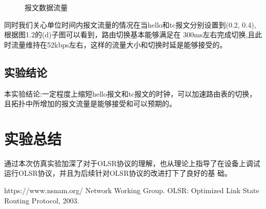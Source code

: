 \documentclass[a4paper,12pt]{report}
\begin{document}
\begin{spacing}{1.5}
\begin{figure}[hbtp]
\caption{报文数据流量}
\end{figure}


同时我们关心单位时间内报文流量的情况在当hello和tc报文分别设置到(0.2, 0.4),根据图1.2的(d)子图可以看到，路由切换基本能够满足在
300ms左右完成切换,且此时流量维持在52kbps左右，这样的流量大小和切换时延是能够接受的。

\section{实验结论}
本实验结论:一定程度上缩短hello报文和tc报文的时钟，可以加速路由表的切换，且拓扑中所增加的报文流量是能够接受和可以预期的。
\end{spacing}

\chapter{实验总结}
\begin{spacing}{1.5}
通过本次仿真实验加深了对于OLSR协议的理解，也从理论上指导了在设备上调试运行OLSR协议，并且为后续针对OLSR协议的改进打下了良好的基
础。
\end{spacing}


\begin{thebibliography}{99}
\songti {} 	
	https://www.nsnam.org/
	Network Working Group. OLSR: Optimized Link State Routing Protocol, 2003.
	
\end{thebibliography}

\end{document}

